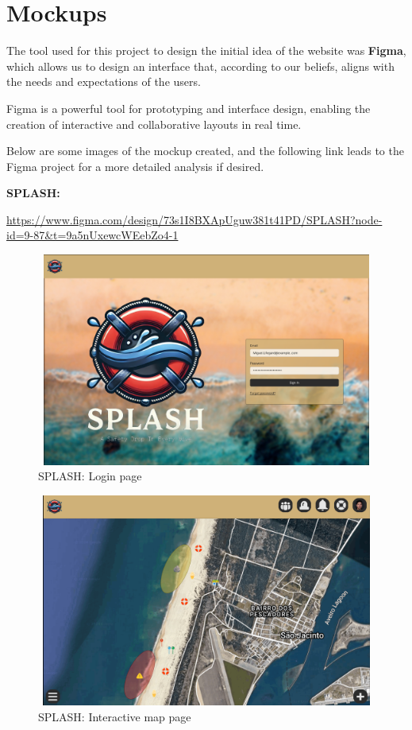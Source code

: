 \chapter{Mockups}
\label{chapter:Mockups}
The tool used for this project to design the initial idea of the website was \textbf{Figma}, which allows us to design an interface that, according to our beliefs, aligns with the needs and expectations of the users.

Figma is a powerful tool for prototyping and interface design, enabling the creation of interactive and collaborative layouts in real time.

Below are some images of the mockup created, and the following link leads to the Figma project for a more detailed analysis if desired.

\textbf{SPLASH:}

\url{https://www.figma.com/design/73s1I8BXApUguw381t41PD/SPLASH?node-id=9-87&t=9a5nUxewcWEebZo4-1}

\begin{figure}[H]
      \centering
      \includegraphics[width=13cm,height=7cm]{figs/Mockups/Login.png}
      \caption{SPLASH: Login page}
      \label{fig:Login}
\end{figure}

\begin{figure}[H]
      \centering
      \includegraphics[width=13cm,height=7cm]{figs/Mockups/MAP.png}
      \caption{SPLASH: Interactive map page}
      \label{fig:Login}
\end{figure}

